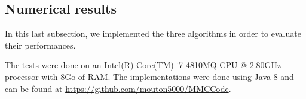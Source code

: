 \subsection{Numerical results}

In this last subsection, we implemented the three algorithms in order to evaluate their performances.

The tests were done on an Intel(R) Core(TM) i7-4810MQ CPU @ 2.80GHz processor with 8Go of RAM. The implementations were done using Java 8 and can be found at \url{https://github.com/mouton5000/MMCCode}.

